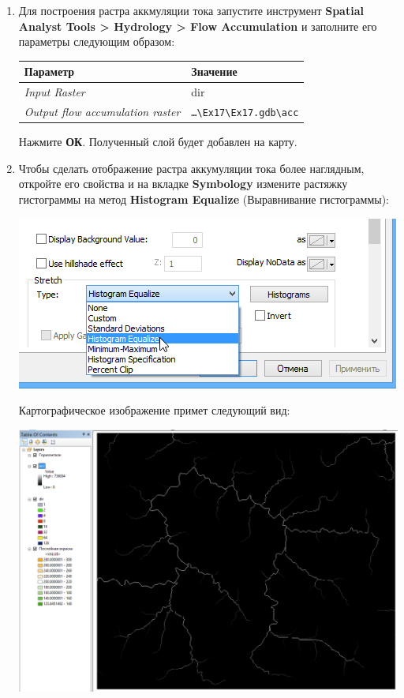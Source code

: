 \documentclass[]{book}
\theoremstyle{definition}
\theoremstyle{definition}
\theoremstyle{definition}
\theoremstyle{remark}
\begin{document}
\begin{enumerate}
\def\labelenumi{\arabic{enumi}.}
\item
  Для построения растра аккмуляции тока запустите инструмент
  \textbf{Spatial Analyst Tools \textgreater{} Hydrology \textgreater{}
  Flow Accumulation} и заполните его параметры следующим образом:

  \begin{longtable}[]{@{}ll@{}}
  \toprule
  Параметр & Значение\tabularnewline
  \midrule
  \endhead
  \emph{Input Raster} & dir\tabularnewline
  \emph{Output flow accumulation raster} &
  \texttt{\ldots{}\textbackslash{}Ex17\textbackslash{}Ex17.gdb\textbackslash{}acc}\tabularnewline
  \bottomrule
  \end{longtable}

  Нажмите \textbf{ОК}. Полученный слой будет добавлен на карту.
\item
  Чтобы сделать отображение растра аккумуляции тока более наглядным,
  откройте его свойства и на вкладке \textbf{Symbology} измените
  растяжку гистограммы на метод \textbf{Histogram Equalize}
  (Выравнивание гистограммы):

  \includegraphics{images/Ex17/image12.png}

  Картографическое изображение примет следующий вид:

  \includegraphics{images/Ex17/image13.png}
\end{enumerate}
\end{document}
